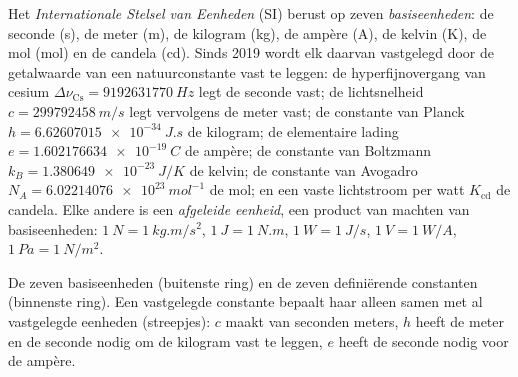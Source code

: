 \begin{definition}\label{def:b1:units-dimensions:si}
Het \emph{Internationale Stelsel van Eenheden} (SI) berust op zeven
\emph{basiseenheden}: de seconde (\unit{s}), de meter (\unit{m}), de
kilogram (\unit{kg}), de ampère (\unit{A}), de kelvin (\unit{K}), de
mol (\unit{mol}) en de candela (\unit{cd}). Sinds 2019 wordt elk daarvan
vastgelegd door de getalwaarde van een natuurconstante vast te leggen: de
hyperfijnovergang van cesium $\Delta\nu_{\mathrm{Cs}} = \qty{9192631770}{Hz}$
legt de seconde vast; de lichtsnelheid $c = \qty{299792458}{m/s}$ legt
vervolgens de meter vast; de constante van Planck
$h = \qty{6.62607015e-34}{J.s}$ de kilogram; de elementaire
lading $e = \qty{1.602176634e-19}{C}$ de ampère; de constante van Boltzmann
$k_B = \qty{1.380649e-23}{J/K}$ de kelvin; de constante van Avogadro
$N_A = \qty{6.02214076e23}{mol^{-1}}$ de mol; en een vaste lichtstroom
per watt $K_{\mathrm{cd}}$ de candela. Elke andere  is een
\emph{afgeleide eenheid}, een product van machten
van basiseenheden: $\qty{1}{N} = \qty{1}{kg.m/s^2}$, $\qty{1}{J} = \qty{1}{N.m}$,
$\qty{1}{W} = \qty{1}{J/s}$, $\qty{1}{V} = \qty{1}{W/A}$,
$\qty{1}{Pa} = \qty{1}{N/m^2}$.
\end{definition}

\begin{omfigure}

{\small De zeven basiseenheden (buitenste ring) en de zeven definiërende
constanten (binnenste ring). Een vastgelegde constante bepaalt haar 
alleen samen met al vastgelegde eenheden (streepjes): $c$ maakt van seconden
meters, $h$ heeft de meter en de seconde nodig om de kilogram vast te leggen,
$e$ heeft de seconde nodig voor de ampère.}
\end{omfigure}

